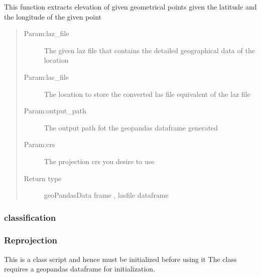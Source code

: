 \documentclass[letterpaper,10pt,english]{sphinxmanual}
\begin{document}
\begin{fulllineitems}
\label{\detokenize{tutorial:get_elevation}}
\sphinxAtStartPar
This function extracts elevation of given geometrical points given the latitude and the longitude of the given point
\begin{quote}\begin{description}
\item[{Param:laz\_file}] \leavevmode
\sphinxAtStartPar
The given laz file that contains the detailed geographical data  of the location

\item[{Param:las\_file}] \leavevmode
\sphinxAtStartPar
The location to store the converted las file equivalent of the laz file

\item[{Param:output\_path}] \leavevmode
\sphinxAtStartPar
The output path fot the geopandas dataframe generated

\item[{Param:crs}] \leavevmode
\sphinxAtStartPar
The projection crs you desire to use

\item[{Return type}] \leavevmode
\sphinxAtStartPar
geoPandasData frame , lasfile dataframe

\end{description}\end{quote}

\end{fulllineitems}



\subsubsection{classification}
\label{\detokenize{tutorial:classification}}
\noindent{}


\subsubsection{Reprojection}
\label{\detokenize{tutorial:reprojection}}
\sphinxAtStartPar
This is a class script and hence must be initialized before using it
The class requires a geopandas dataframe for initialization.

\sphinxAtStartPar
{}
\end{document}
